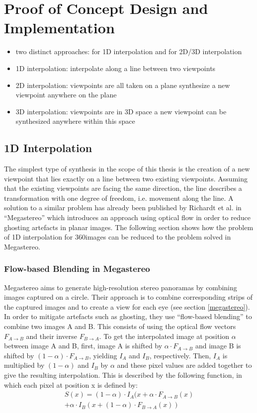 \chapter{Proof of Concept Design and Implementation}
\begin{itemize}
\item two distinct approaches: for 1D interpolation and for 2D/3D interpolation
\item 1D interpolation: interpolate along a line between two viewpoints
\item 2D interpolation: viewpoints are all taken on a plane \ar synthesize a new viewpoint anywhere on the plane
\item 3D interpolation: viewpoints are in 3D space \ar a new viewpoint can be synthesized anywhere within this space
\end{itemize}

\section{1D Interpolation}
The simplest type of synthesis in the scope of this thesis is the creation of a new viewpoint that lies exactly on a line between two existing viewpoints. Assuming that the existing viewpoints are facing the same direction, the line describes a transformation with one degree of freedom, i.e. movement along the line. A solution to a similar problem has already been published by Richardt et al. in ``Megastereo'' \cite{megastereo} which introduces an approach using optical flow in order to reduce ghosting artefacts in planar images. The following section shows how the problem of 1D interpolation for 360\degree images can be reduced to the problem solved in Megastereo.

\subsection{Flow-based Blending in Megastereo}
Megastereo aims to generate high-resolution stereo panoramas by combining images captured on a circle. Their approach is to combine corresponding strips of the captured images and to create a view for each eye (see section \ref{megastereo}). In order to mitigate artefacts such as ghosting, they use ``flow-based blending'' to combine two images A and B. This consists of using the optical flow vectors $F_{A\rightarrow B}$ and their inverse $F_{B\rightarrow A}$. To get the interpolated image at position $\alpha$ between image A and B, first, image A is shifted by $\alpha \cdot F_{A\to B}$ and image B is shifted by $(1 - \alpha) \cdot F_{A\to B}$, yielding $I_A$ and $I_B$, respectively. Then, $I_A$ is multiplied by $(1-\alpha)$ and $I_B$ by $\alpha$ and these pixel values are added together to give the resulting interpolation. This is described by the following function, in which each pixel at position x is defined by: 
\begin{align}
S(x) = (1-\alpha ) \cdot I_A( x + \alpha \cdot F_{A\to B}(x) \\
     + \alpha \cdot I_B( x + (1-\alpha) \cdot F_{B\to A}(x))
\end{align}

